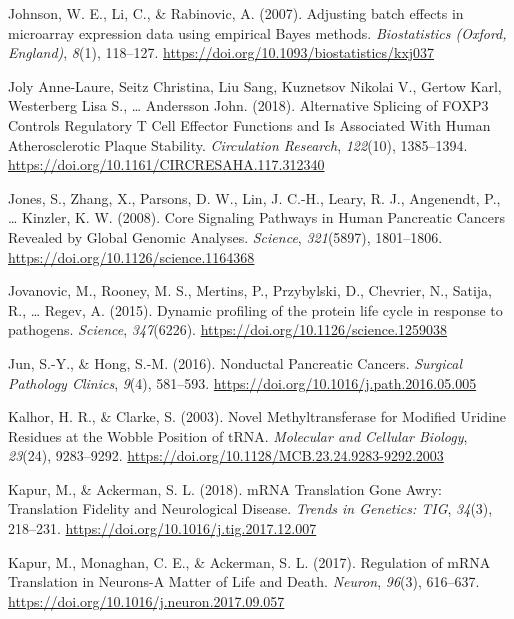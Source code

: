 \documentclass[12pt,openany]{book}
\begin{document}
\hypertarget{ref-Johnson2007}{}
Johnson, W. E., Li, C., \& Rabinovic, A. (2007). Adjusting batch effects
in microarray expression data using empirical Bayes methods.
\emph{Biostatistics (Oxford, England)}, \emph{8}(1), 118--127.
\url{https://doi.org/10.1093/biostatistics/kxj037}

\hypertarget{ref-JolyAnne-Laure2018}{}
Joly Anne-Laure, Seitz Christina, Liu Sang, Kuznetsov Nikolai V., Gertow
Karl, Westerberg Lisa S., \ldots{} Andersson John. (2018). Alternative
Splicing of FOXP3 Controls Regulatory T Cell Effector Functions and Is
Associated With Human Atherosclerotic Plaque Stability.
\emph{Circulation Research}, \emph{122}(10), 1385--1394.
\url{https://doi.org/10.1161/CIRCRESAHA.117.312340}

\hypertarget{ref-Jones2008}{}
Jones, S., Zhang, X., Parsons, D. W., Lin, J. C.-H., Leary, R. J.,
Angenendt, P., \ldots{} Kinzler, K. W. (2008). Core Signaling Pathways
in Human Pancreatic Cancers Revealed by Global Genomic Analyses.
\emph{Science}, \emph{321}(5897), 1801--1806.
\url{https://doi.org/10.1126/science.1164368}

\hypertarget{ref-Jovanovic2015}{}
Jovanovic, M., Rooney, M. S., Mertins, P., Przybylski, D., Chevrier, N.,
Satija, R., \ldots{} Regev, A. (2015). Dynamic profiling of the protein
life cycle in response to pathogens. \emph{Science}, \emph{347}(6226).
\url{https://doi.org/10.1126/science.1259038}

\hypertarget{ref-Jun2016}{}
Jun, S.-Y., \& Hong, S.-M. (2016). Nonductal Pancreatic Cancers.
\emph{Surgical Pathology Clinics}, \emph{9}(4), 581--593.
\url{https://doi.org/10.1016/j.path.2016.05.005}

\hypertarget{ref-Kalhor2003}{}
Kalhor, H. R., \& Clarke, S. (2003). Novel Methyltransferase for
Modified Uridine Residues at the Wobble Position of tRNA.
\emph{Molecular and Cellular Biology}, \emph{23}(24), 9283--9292.
\url{https://doi.org/10.1128/MCB.23.24.9283-9292.2003}

\hypertarget{ref-Kapur2018}{}
Kapur, M., \& Ackerman, S. L. (2018). mRNA Translation Gone Awry:
Translation Fidelity and Neurological Disease. \emph{Trends in Genetics:
TIG}, \emph{34}(3), 218--231.
\url{https://doi.org/10.1016/j.tig.2017.12.007}

\hypertarget{ref-Kapur2017}{}
Kapur, M., Monaghan, C. E., \& Ackerman, S. L. (2017). Regulation of
mRNA Translation in Neurons-A Matter of Life and Death. \emph{Neuron},
\emph{96}(3), 616--637.
\url{https://doi.org/10.1016/j.neuron.2017.09.057}
\end{document}
